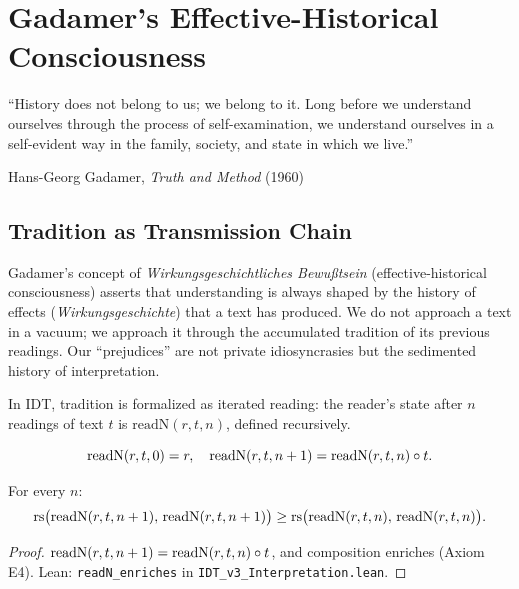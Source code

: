 
\chapter{Gadamer's Effective-Historical Consciousness}
\label{ch:gadamer-consciousness}

\epigraph{``History does not belong to us; we belong to it. Long before we
understand ourselves through the process of self-examination, we understand
ourselves in a self-evident way in the family, society, and state in which
we live.''}{Hans-Georg Gadamer, \textit{Truth and Method} (1960)}

\section{Tradition as Transmission Chain}

Gadamer's concept of \textit{Wirkungsgeschichtliches Bewu\ss tsein}
(effective-historical consciousness) asserts that understanding is always shaped
by the history of effects (\textit{Wirkungsgeschichte}) that a text has
produced. We do not approach a text in a vacuum; we approach it through the
accumulated tradition of its previous readings. Our ``prejudices'' are not
private idiosyncrasies but the sedimented history of interpretation.

In IDT, tradition is formalized as iterated reading: the reader's state after
$n$ readings of text $t$ is $\mathrm{readN}(r, t, n)$, defined recursively.

\begin{definition}
\label{def:iterated-reading}
\[
\mathrm{readN}(r, t, 0) = r, \quad
\mathrm{readN}(r, t, n+1) = \mathrm{readN}(r, t, n) \circ t.
\]
\end{definition}

\begin{theorem}
\label{thm:readn-enriches}
For every $n$:
\[
\mathrm{rs}\bigl(\mathrm{readN}(r, t, n+1),\, \mathrm{readN}(r, t, n+1)\bigr)
\geq \mathrm{rs}\bigl(\mathrm{readN}(r, t, n),\, \mathrm{readN}(r, t, n)\bigr).
\]
\end{theorem}

\begin{proof}
$\mathrm{readN}(r, t, n+1) = \mathrm{readN}(r, t, n) \circ t$, and
composition enriches (Axiom E4).
Lean: \texttt{readN\_enriches} in \texttt{IDT\_v3\_Interpretation.lean}.
\end{proof}

